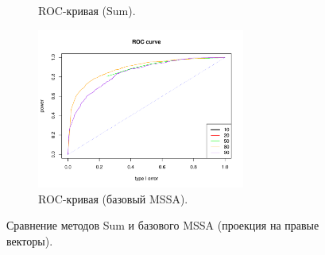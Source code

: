 \documentclass[specialist,
substylefile = spbu_report.rtx,
subf,href,colorlinks=true, 12pt]{disser}
\theoremstyle{definition}
\begin{document}
\begin{figure}
\begin{subfigure}[t]{0.45\textwidth}
		\caption{ROC-кривая (Sum).}
	\end{subfigure}\hspace{\fill}
	\begin{subfigure}[t]{0.45\textwidth}
		\centering
		\includegraphics[width=0.75\textwidth]{img/roc_mssa_fa.pdf}
		\caption{ROC-кривая (базовый MSSA).}
	\end{subfigure}
	\caption{Сравнение методов Sum и базового MSSA (проекция на правые векторы).}
	\label{fig:sum_fa}
\end{figure}
\end{document}
